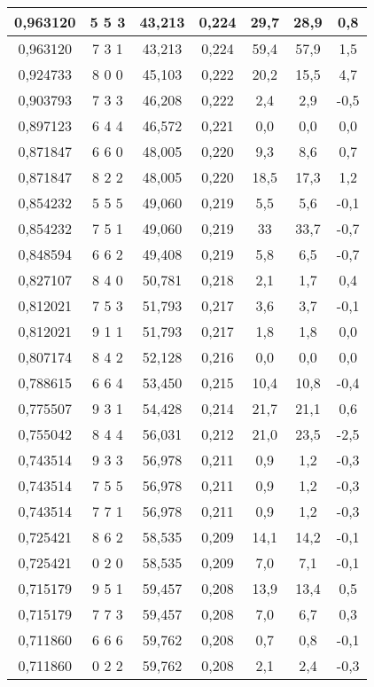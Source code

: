 \documentclass[a4paper,12pt]{article}
\numberwithin{equation}{section}
\begin{document}
\begin{appendices}
\begin{longtable}[c]{|c|c|c|c|c|c|c|}
0,963120	&	5   5   3	&	43,213	&	0,224	&	29,7	&	28,9	&	0,8	\\\hline
0,963120	&	7   3   1	&	43,213	&	0,224	&	59,4	&	57,9	&	1,5	\\\hline
0,924733	&	8   0   0	&	45,103	&	0,222	&	20,2	&	15,5	&	4,7	\\\hline
0,903793	&	7   3   3	&	46,208	&	0,222	&	2,4	&	2,9	&	-0,5	\\\hline
0,897123	&	6   4   4	&	46,572	&	0,221	&	0,0	&	0,0	&	0,0	\\\hline
0,871847	&	6   6   0	&	48,005	&	0,220	&	9,3	&	8,6	&	0,7	\\\hline
0,871847	&	8   2   2	&	48,005	&	0,220	&	18,5	&	17,3	&	1,2	\\\hline
0,854232	&	5   5   5	&	49,060	&	0,219	&	5,5	&	5,6	&	-0,1	\\\hline
0,854232	&	7   5   1	&	49,060	&	0,219	&	33	&	33,7	&	-0,7	\\\hline
0,848594	&	6   6   2	&	49,408	&	0,219	&	5,8	&	6,5	&	-0,7	\\\hline
0,827107	&	8   4   0	&	50,781	&	0,218	&	2,1	&	1,7	&	0,4	\\\hline
0,812021	&	7   5   3	&	51,793	&	0,217	&	3,6	&	3,7	&	-0,1	\\\hline
0,812021	&	9   1   1	&	51,793	&	0,217	&	1,8	&	1,8	&	0,0	\\\hline
0,807174	&	8   4   2	&	52,128	&	0,216	&	0,0	&	0,0	&	0,0	\\\hline
0,788615	&	6   6   4	&	53,450	&	0,215	&	10,4	&	10,8	&	-0,4	\\\hline
0,775507	&	9   3   1	&	54,428	&	0,214	&	21,7	&	21,1	&	0,6	\\\hline
0,755042	&	8   4   4	&	56,031	&	0,212	&	21,0	&	23,5	&	-2,5	\\\hline
0,743514	&	9   3   3	&	56,978	&	0,211	&	0,9	&	1,2	&	-0,3	\\\hline
0,743514	&	7   5   5	&	56,978	&	0,211	&	0,9	&	1,2	&	-0,3	\\\hline
0,743514	&	7   7   1	&	56,978	&	0,211	&	0,9	&	1,2	&	-0,3	\\\hline
0,725421	&	8   6   2	&	58,535	&	0,209	&	14,1	&	14,2	&	-0,1	\\\hline
0,725421	&	0   2   0	&	58,535	&	0,209	&	7,0	&	7,1	&	-0,1	\\\hline
0,715179	&	9   5   1	&	59,457	&	0,208	&	13,9	&	13,4	&	0,5	\\\hline
0,715179	&	7   7   3	&	59,457	&	0,208	&	7,0	&	6,7	&	0,3	\\\hline
0,711860	&	6   6   6	&	59,762	&	0,208	&	0,7	&	0,8	&	-0,1	\\\hline
0,711860	&	0   2   2	&	59,762	&	0,208	&	2,1	&	2,4	&	-0,3	\\\hline



\end{longtable}
\end{appendices}
\end{document}
